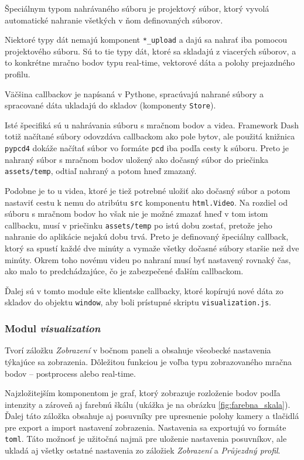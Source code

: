 Špeciálnym typom nahrávaného súboru je projektový súbor, ktorý vyvolá automatické nahranie všetkých v ňom definovaných súborov.

Niektoré typy dát nemajú komponent \texttt{*\_upload} a dajú sa nahrať iba pomocou projektového súboru. Sú to tie typy dát, ktoré sa skladajú z viacerých súborov, a to konkrétne mračno bodov typu real-time, vektorové dáta a polohy prejazdného profilu.

Väčšina callbackov je napísaná v Pythone, spracúvajú nahrané súbory a spracované dáta ukladajú do skladov (komponenty \texttt{Store}).

Isté špecifiká sú u nahrávania súboru s mračnom bodov a videa. Framework Dash totiž načítané súbory odovzdáva callbackom ako pole bytov, ale použitá knižnica \texttt{pypcd4} dokáže načítať súbor vo formáte \texttt{pcd} iba podľa cesty k súboru. Preto je nahraný súbor s mračnom bodov uložený ako dočasný súbor do priečinka \texttt{assets/temp}, odtiaľ nahraný a potom hneď zmazaný.

Podobne je to u videa, ktoré je tiež potrebné uložiť ako dočasný súbor a potom nastaviť cestu k nemu do atribútu \texttt{src} komponentu \texttt{html.Video}. Na rozdiel od súboru s mračnom bodov ho však nie je možné zmazať hneď v tom istom callbacku, musí v priečinku \texttt{assets/temp} po istú dobu zostať, pretože jeho nahranie do aplikácie nejakú dobu trvá. Preto je definovaný špeciálny callback, ktorý sa spustí každé dve minúty a vymaže všetky dočasné súbory staršie než dve minúty. Okrem toho novému videu po nahraní musí byť nastavený rovnaký čas, ako malo to predchádzajúce, čo je zabezpečené ďalším callbackom.

Ďalej sú v tomto module ešte klientske callbacky, ktoré kopírujú nové dáta zo skladov do objektu \texttt{window}, aby boli prístupné skriptu \texttt{visualization.js}.

\subsubsection{Modul \emph{visualization} }

Tvorí záložku \emph{Zobrazení} v bočnom paneli a obsahuje všeobecké nastavenia týkajúce sa zobrazenia. Dôležitou funkciou je voľba typu zobrazovaného mračna bodov -- postprocess alebo real-time.

Najzložitejším komponentom je graf, ktorý zobrazuje rozloženie bodov podľa intenzity a zároveň aj farebnú škálu (ukážka je na obrázku \ref{fig:farebna_skala}). Ďalej táto záložka obsahuje aj posuvníky pre upresnenie polohy kamery a tlačidlá pre export a import nastavení zobrazenia. Nastavenia sa exportujú vo formáte \texttt{toml}. Táto možnosť je užitočná najmä pre uloženie nastavenia posuvníkov, ale ukladá aj všetky ostatné nastavenia zo záložiek \emph{Zobrazení} a \emph{Průjezdný profil}.

